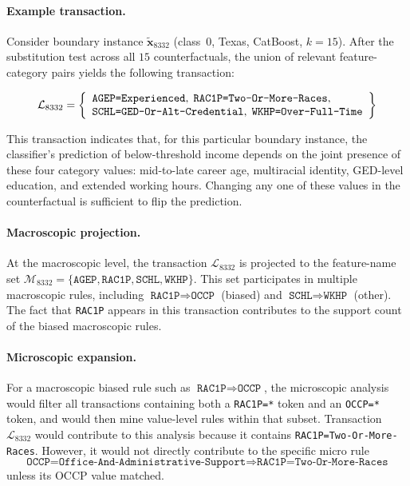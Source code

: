 \paragraph{Example transaction.} Consider boundary instance $\tilde{\mathbf{x}}_{8332}$ (class~0, Texas, CatBoost, $k = 15$). After the substitution test across all $15$ counterfactuals, the union of relevant feature-category pairs yields the following transaction:

\[
\mathcal{L}_{8332} = \left\{ \begin{array}{l}
\texttt{AGEP=Experienced},\; \texttt{RAC1P=Two-Or-\allowbreak More-Races},\\
\texttt{SCHL=GED-Or-Alt-Credential},\; \texttt{WKHP=Over-Full-Time}
\end{array} \right\}
\]

This transaction indicates that, for this particular boundary instance, the classifier's prediction of below-threshold income depends on the joint presence of these four category values: mid-to-late career age, multiracial identity, GED-level education, and extended working hours. Changing any one of these values in the counterfactual is sufficient to flip the prediction.

\paragraph{Macroscopic projection.} At the macroscopic level, the transaction $\mathcal{L}_{8332}$ is projected to the feature-name set $\mathcal{M}_{8332} = \{\texttt{AGEP}, \texttt{RAC1P}, \texttt{SCHL}, \texttt{WKHP}\}$. This set participates in multiple macroscopic rules, including $\texttt{RAC1P} \Rightarrow \texttt{OCCP}$ (biased) and $\texttt{SCHL} \Rightarrow \texttt{WKHP}$ (other). The fact that \texttt{RAC1P} appears in this transaction contributes to the support count of the biased macroscopic rules.

\paragraph{Microscopic expansion.} For a macroscopic biased rule such as $\texttt{RAC1P} \Rightarrow \texttt{OCCP}$, the microscopic analysis would filter all transactions containing both a \texttt{RAC1P=*} token and an \texttt{OCCP=*} token, and would then mine value-level rules within that subset. Transaction $\mathcal{L}_{8332}$ would contribute to this analysis because it contains \texttt{RAC1P=Two-Or-\allowbreak More-Races}. However, it would not directly contribute to the specific micro rule
\[
\texttt{OCCP=Office-And-Administrative-Support} \Rightarrow \texttt{RAC1P=Two-Or-More-Races}
\]
unless its OCCP value matched.
